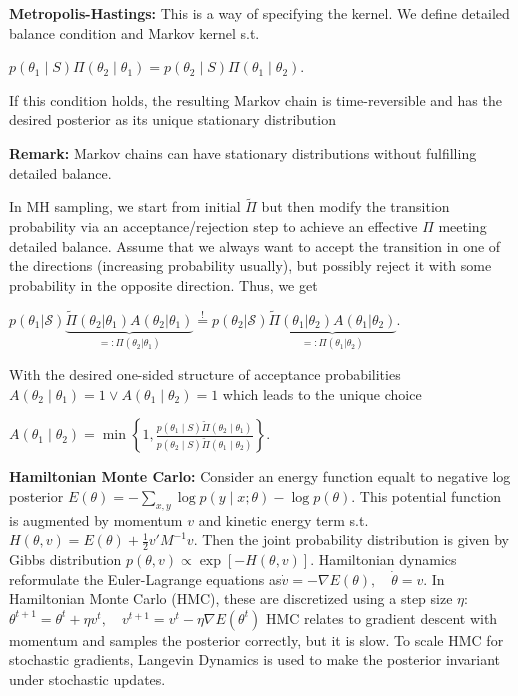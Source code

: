 \textbf{Metropolis-Hastings:} This is a way of specifying the kernel. We define detailed balance condition and Markov kernel s.t. 

 $p(\theta_1 \mid S) \Pi(\theta_2 \mid \theta_1) = p(\theta_2 \mid S) \Pi(\theta_1 \mid \theta_2)
 $.
 
 If this condition holds, the resulting Markov chain is time-reversible and
 has the desired posterior as its unique stationary distribution
 
\textbf{Remark:}  Markov chains can have stationary distributions without fulfilling detailed balance.

In MH sampling, we start from initial $\tilde{\Pi}$ but then modify the transition probability via an acceptance/rejection step to achieve an effective $\Pi$ meeting detailed balance. Assume that we always want to accept the
 transition in one of the directions (increasing probability usually),
 but possibly reject it with some probability in the opposite direction. Thus, we get
 
 $p(\theta_1|\mathcal{S}) \underbrace{\tilde{\Pi}(\theta_2|\theta_1)A(\theta_2|\theta_1)}_{=:\Pi(\theta_2|\theta_1)} \stackrel{!}{=} p(\theta_2|\mathcal{S}) \underbrace{\tilde{\Pi}(\theta_1|\theta_2)A(\theta_1|\theta_2)}_{=:\Pi(\theta_1|\theta_2)}
.
$

With the desired one-sided structure of acceptance probabilities $A(\theta_2 \mid \theta_1) = 1 \lor A(\theta_1 \mid \theta_2) = 1$ which leads to the unique choice 

$A(\theta_1 \mid \theta_2) = \min \left\{ 1, \frac{p(\theta_1 \mid S) \tilde{\Pi}(\theta_2 \mid \theta_1)}{p(\theta_2 \mid S) \tilde{\Pi}(\theta_1 \mid \theta_2)} \right\}.
$

\textbf{ Hamiltonian Monte Carlo:} Consider an energy function equalt to negative log posterior $E(\theta) = - \sum_{x, y} \log p(y \mid x; \theta) - \log p(\theta).$ This potential function is augmented by momentum $v$ and kinetic energy term s.t. $H(\theta, v) = E(\theta) + \frac{1}{2} v' M^{-1} v.$ Then the joint probability distribution is given by Gibbs distribution 
$p(\theta, v) \propto \exp[-H(\theta, v)].$ Hamiltonian dynamics reformulate the Euler-Lagrange equations as$
\dot{v} = -\nabla E(\theta), \quad \dot{\theta} = v.$
In Hamiltonian Monte Carlo (HMC), these are discretized using a step size \(\eta\):
$
\theta^{t+1} = \theta^t + \eta v^t, \quad v^{t+1} = v^t - \eta \nabla E(\theta^t)
$
HMC relates to gradient descent with momentum and samples the posterior correctly, but it is slow. To scale HMC for stochastic gradients, Langevin Dynamics is used to make the posterior invariant under stochastic updates.

